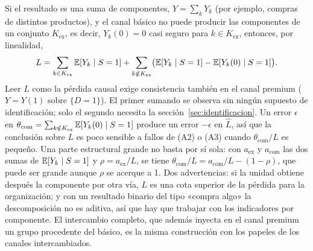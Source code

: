 \begin{observacion}\label{obs:descomposicion}
Si el resultado es una suma de componentes, $Y=\sum_k Y_k$ (por ejemplo, compras de distintos productos), y el canal básico no puede producir las componentes de un conjunto $K_{\mathrm{ex}}$, es decir, $Y_k(0)=0$ casi seguro para $k\in K_{\mathrm{ex}}$, entonces, por linealidad,
\[
L=\sum_{k\in K_{\mathrm{ex}}}\mathbb{E}[Y_k\mid S=1]+\sum_{k\notin K_{\mathrm{ex}}}\bigl(\mathbb{E}[Y_k\mid S=1]-\mathbb{E}[Y_k(0)\mid S=1]\bigr).
\]
Leer $L$ como la pérdida causal exige consistencia también en el canal premium ($Y=Y(1)$ sobre $\{D=1\}$). El primer sumando se observa sin ningún supuesto de identificación; solo el segundo necesita la sección~\ref{sec:identificacion}. Un error $\epsilon$ en $\theta_{\mathrm{com}}=\sum_{k\notin K_{\mathrm{ex}}}\mathbb{E}[Y_k(0)\mid S=1]$ produce un error $-\epsilon$ en $\hat L$, así que la conclusión sobre $L$ es poco sensible a fallos de (A2) o (A3) cuando $\theta_{\mathrm{com}}/L$ es pequeño. Una parte estructural grande no basta por sí sola: con $a_{\mathrm{ex}}$ y $a_{\mathrm{com}}$ las dos sumas de $\mathbb{E}[Y_k\mid S=1]$ y $\rho=a_{\mathrm{ex}}/L$, se tiene $\theta_{\mathrm{com}}/L=a_{\mathrm{com}}/L-(1-\rho)$, que puede ser grande aunque $\rho$ se acerque a 1. Dos advertencias: si la unidad obtiene después la componente por otra vía, $L$ es una cota superior de la pérdida para la organización; y con un resultado binario del tipo «compra algo» la descomposición no es aditiva, así que hay que trabajar con los indicadores por componente. El intercambio completo, que además inyecta en el canal premium un grupo procedente del básico, es la misma construcción con los papeles de los canales intercambiados.
\end{observacion}
